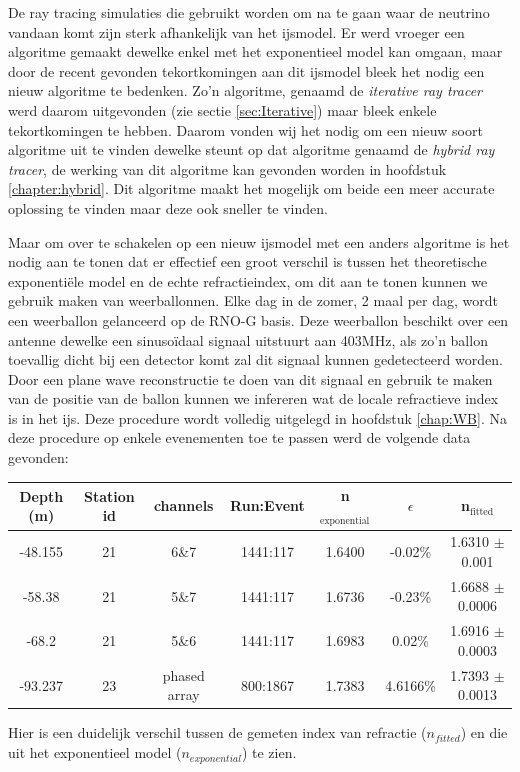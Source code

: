 \documentclass[11pt,a4paper,faculty=we,language=en,doctype=report]{cls/ugent-doc}
\begin{document}
De ray tracing simulaties die gebruikt worden om na te gaan waar de neutrino
vandaan komt zijn sterk afhankelijk van het ijsmodel.  Er werd vroeger een
algoritme gemaakt dewelke enkel met het exponentieel model kan omgaan, maar
door de recent gevonden tekortkomingen aan dit ijsmodel bleek het nodig een
nieuw algoritme te bedenken. Zo'n algoritme, genaamd de \textit{iterative ray
tracer} werd daarom uitgevonden (zie sectie \ref{sec:Iterative}) maar bleek
enkele tekortkomingen te hebben. Daarom vonden wij het nodig om een nieuw soort
algoritme uit te vinden dewelke steunt op dat algoritme genaamd de
\textit{hybrid ray tracer}, de werking van dit algoritme kan gevonden worden in
hoofdstuk \ref{chapter:hybrid}. Dit algoritme maakt het mogelijk om beide een
meer accurate oplossing te vinden maar deze ook sneller te vinden.

Maar om over te schakelen op een nieuw ijsmodel met een anders algoritme is het nodig aan te tonen dat er effectief
een groot verschil is tussen het theoretische exponentiële model en de echte refractieindex, om dit aan te tonen 
kunnen we gebruik maken van weerballonnen. Elke dag in de zomer, 2 maal per dag, wordt een weerballon gelanceerd 
op de RNO-G basis. 
Deze weerballon beschikt over een antenne dewelke een sinusoïdaal signaal uitstuurt aan 403MHz, als zo'n ballon toevallig
dicht bij een detector komt zal dit signaal kunnen gedetecteerd worden. Door een plane wave reconstructie te doen
van dit signaal en gebruik te maken van de positie van de ballon kunnen we infereren wat de locale refractieve index
is in het ijs. Deze procedure wordt volledig uitgelegd in hoofdstuk \ref{chap:WB}.
Na deze procedure op enkele evenementen toe te passen werd de volgende data gevonden:
\begin{center}
\begin{tabular}{||c c c c c c c||}
 \hline
 Depth (m) & Station id & channels & Run:Event & n$_\text{exponential}$ & $\epsilon$ & n$_\text{fitted}$\\ [0.5ex]
 \hline\hline
-48.155 & 21 & 6\&7 & 1441:117 & 1.6400 & -0.02\% & 1.6310 $\pm$ 0.001 \\
 -58.38 & 21 & 5\&7 & 1441:117 & 1.6736 & -0.23\% & 1.6688 $\pm$ 0.0006 \\
 -68.2 & 21 & 5\&6 & 1441:117 & 1.6983 & 0.02\% & 1.6916 $\pm$ 0.0003 \\
 -93.237 & 23 & phased array & 800:1867 & 1.7383 & 4.6166\% & 1.7393 $\pm$ 0.0013 \\
 \hline
\end{tabular}
\end{center}
Hier is een duidelijk verschil tussen de gemeten index van refractie ($n_{fitted}$) en die uit het exponentieel model ($n_{exponential}$) te zien.
\newpage
\end{document}
